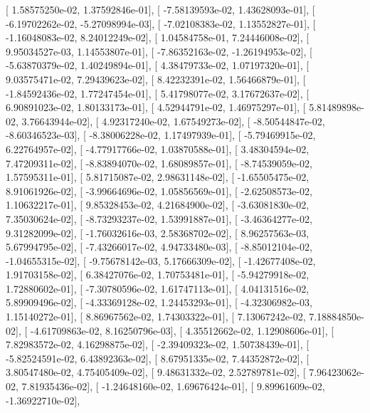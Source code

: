 \documentclass{article}
\begin{document}
       [  1.58575250e-02,   1.37592846e-01],
       [ -7.58139593e-02,   1.43628093e-01],
       [ -6.19702262e-02,  -5.27098994e-03],
       [ -7.02108383e-02,   1.13552827e-01],
       [ -1.16048083e-02,   8.24012249e-02],
       [  1.04584758e-01,   7.24446008e-02],
       [  9.95034527e-03,   1.14553807e-01],
       [ -7.86352163e-02,  -1.26194953e-02],
       [ -5.63870379e-02,   1.40249894e-01],
       [  4.38479733e-02,   1.07197320e-01],
       [  9.03575471e-02,   7.29439623e-02],
       [  8.42232391e-02,   1.56466879e-01],
       [ -1.84592436e-02,   1.77247454e-01],
       [  5.41798077e-02,   3.17672637e-02],
       [  6.90891023e-02,   1.80133173e-01],
       [  4.52944791e-02,   1.46975297e-01],
       [  5.81489898e-02,   3.76643944e-02],
       [  4.92317240e-02,   1.67549273e-02],
       [ -8.50544847e-02,  -8.60346523e-03],
       [ -8.38006228e-02,   1.17497939e-01],
       [ -5.79469915e-02,   6.22764957e-02],
       [ -4.77917766e-02,   1.03870588e-01],
       [  3.48304594e-02,   7.47209311e-02],
       [ -8.83894070e-02,   1.68089857e-01],
       [ -8.74539059e-02,   1.57595311e-01],
       [  5.81715087e-02,   2.98631148e-02],
       [ -1.65505475e-02,   8.91061926e-02],
       [ -3.99664696e-02,   1.05856569e-01],
       [ -2.62508573e-02,   1.10632217e-01],
       [  9.85328453e-02,   4.21684900e-02],
       [ -3.63081830e-02,   7.35030624e-02],
       [ -8.73293237e-02,   1.53991887e-01],
       [ -3.46364277e-02,   9.31282099e-02],
       [ -1.76032616e-03,   2.58368702e-02],
       [  8.96257563e-03,   5.67994795e-02],
       [ -7.43266017e-02,   4.94733480e-03],
       [ -8.85012104e-02,  -1.04655315e-02],
       [ -9.75678142e-03,   5.17666309e-02],
       [ -1.42677408e-02,   1.91703158e-02],
       [  6.38427076e-02,   1.70753481e-01],
       [ -5.94279918e-02,   1.72880602e-01],
       [ -7.30780596e-02,   1.61747113e-01],
       [  4.04131516e-02,   5.89909496e-02],
       [ -4.33369128e-02,   1.24453293e-01],
       [ -4.32306982e-03,   1.15140272e-01],
       [  8.86967562e-02,   1.74303322e-01],
       [  7.13067242e-02,   7.18884850e-02],
       [ -4.61709863e-02,   8.16250796e-03],
       [  4.35512662e-02,   1.12908606e-01],
       [  7.82983572e-02,   4.16298875e-02],
       [ -2.39409323e-02,   1.50738439e-01],
       [ -5.82524591e-02,   6.43892363e-02],
       [  8.67951335e-02,   7.44352872e-02],
       [  3.80547480e-02,   4.75405409e-02],
       [  9.48631332e-02,   2.52789781e-02],
       [  7.96423062e-02,   7.81935436e-02],
       [ -1.24648160e-02,   1.69676424e-01],
       [  9.89961609e-02,  -1.36922710e-02],
\end{document}
